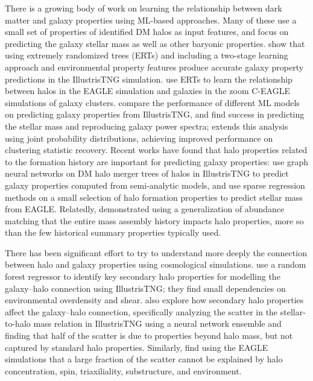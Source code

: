 There is a growing body of work on learning the relationship between dark matter and galaxy properties using ML-based approaches.
Many of these use a small set of properties of identified DM halos as input features, and focus on predicting the galaxy stellar mass as well as other baryonic properties.
\cite{jo_machine-assisted_2019} show that using extremely randomized trees (ERTs) and including a two-stage learning approach and environmental property features produce accurate galaxy property predictions in the IllustrisTNG simulation.
\cite{lovell_machine_2021} use ERTs to learn the relationship between halos in the EAGLE simulation and galaxies in the zoom C-EAGLE simulations of galaxy clusters.
\cite{de_santi_mimicking_2021} compare the performance of different ML models on predicting galaxy properties from IllustrisTNG, and find success in predicting the stellar mass and reproducing galaxy power spectra; \cite{rodrigues_high-fidelity_2023} extends this analysis using joint probability distributions, achieving improved performance on clustering statistic recovery.
Recent works have found that halo properties related to the formation history are important for predicting galaxy properties: \cite{jespersen_learning_2022} use graph neural networks on DM halo merger trees of halos in IllustrisTNG to predict galaxy properties computed from semi-analytic models, and \cite{icaza-lizaola_sparse_2022} use sparse regression methods on a small selection of halo formation properties to predict stellar mass from EAGLE.
Relatedly, \cite{mendoza_multicam_2023} demonstrated using a generalization of abundance matching that the entire mass assembly history impacts halo properties, more so than the few historical summary properties typically used.

There has been significant effort to try to understand more deeply the connection between halo and galaxy properties using cosmological simulations.
\cite{delgado_modeling_2021} use a random forest regressor to identify key secondary halo properties for modelling the galaxy--halo connection using IllustrisTNG; they find small dependencies on environmental overdensity and shear.
\cite{stiskalek_scatter_2022} also explore how secondary halo properties affect the galaxy--halo connection, specifically analyzing the scatter in the stellar-to-halo mass relation in IllustrisTNG using a neural network ensemble and finding that half of the scatter is due to properties beyond halo mass, but not captured by standard halo properties.
Similarly, \cite{matthee_origin_2017} find using the EAGLE simulations that a large fraction of the scatter cannot be explained by halo concentration, spin, triaxiliality, substructure, and environment. 

